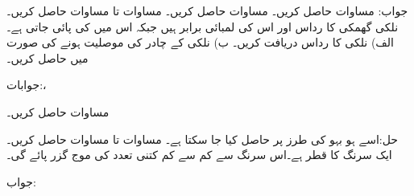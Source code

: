 جواب: 
مساوات  حاصل کریں۔
مساوات  حاصل کریں۔
مساوات  تا مساوات  حاصل کریں۔
نلکی گھمکی کا رداس اور اس کی لمبائی برابر ہیں جبکہ اس میں  کی  پائی جاتی ہے۔ الف) نلکی کا رداس دریافت کریں۔ ب) نلکی کے چادر کی موصلیت  ہونے کی صورت میں  حاصل کریں۔ 

جوابات:، 

مساوات  حاصل کریں۔

حل:اسے ہو بہو  کی طرز پر حاصل کیا جا سکتا ہے۔ 
مساوات  تا مساوات  حاصل کریں۔
ایک سرنگ کا قطر  ہے۔اس سرنگ سے کم سے کم کتنی  تعدد کی موج گزر پائے گی۔

جواب:

